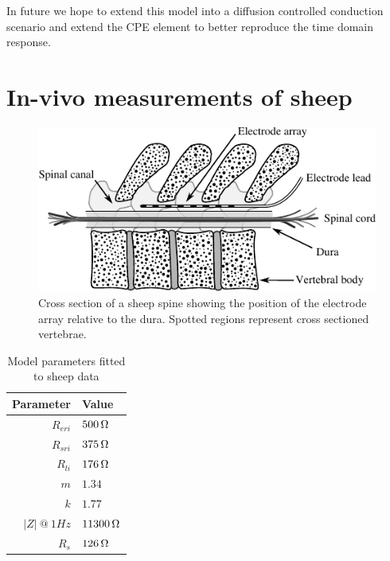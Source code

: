 \documentclass[journal, a4paper]{IEEEtran}
\begin{document}
In future we hope to extend this model into a diffusion controlled conduction scenario and extend the CPE element to better reproduce the time domain response.





\section{In-vivo measurements of sheep}
\label{sect:in-vivo}
\begin{figure}
    \begin{center}
        \includegraphics{graphics/sheepSpine}
    \end{center}
    \caption{Cross section of a sheep spine showing the position of the electrode array relative to the dura. Spotted regions represent cross sectioned vertebrae.}
    \label{fig:sheepSpine}
\end{figure}

\begin{table}
    \caption{Model parameters fitted to sheep data}
    \label{tab:sheepParameters}
    \begin{center}
        \begin{tabular}{r | l}
            Parameter & Value \\
            \hline
            $R_{eri}$ & $500\thinspace \Omega$\\
            $R_{sri}$ & $375\thinspace \Omega$\\
            $R_{li}$  & $176\thinspace \Omega$\\
            $m$       & $1.34$\\
            $k$       & $1.77$\\
            $|Z|\: @\: 1Hz$& $11300\thinspace \Omega$\\
            $R_{s}$   & $126\thinspace \Omega$
        \end{tabular}
    \end{center}
\end{table}
\end{document}
